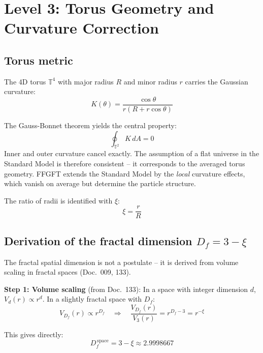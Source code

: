 \section{Level 3: Torus Geometry and Curvature Correction}

\subsection{Torus metric}

The 4D torus $\mathbb{T}^4$ with major radius $R$ and minor radius $r$
carries the Gaussian curvature:
\begin{equation}
    K(\theta) = \frac{\cos\theta}{r(R + r\cos\theta)}
\end{equation}

The Gauss-Bonnet theorem yields the central property:
\begin{equation}
    \oint_{\mathbb{T}^2} K \, dA = 0
\end{equation}
Inner and outer curvature cancel exactly. The assumption of a flat
universe in the Standard Model is therefore consistent -- it corresponds
to the averaged torus geometry. FFGFT extends the Standard Model by
the \emph{local} curvature effects, which vanish on average but
determine the particle structure.

The ratio of radii is identified with $\xi$:
\begin{equation}
    \xi = \frac{r}{R}
\end{equation}

\subsection{Derivation of the fractal dimension \texorpdfstring{$D_f = 3 - \xi$}{Df = 3 - xi}}

The fractal spatial dimension is not a postulate -- it is derived
from volume scaling in fractal spaces (Doc.~009, 133).

\textbf{Step 1: Volume scaling} (from Doc.~133):
In a space with integer dimension $d$, $V_d(r) \propto r^d$.
In a slightly fractal space with $D_f$:
\begin{equation}
    V_{D_f}(r) \propto r^{D_f}
    \quad \Rightarrow \quad
    \frac{V_{D_f}(r)}{V_3(r)} = r^{D_f - 3} = r^{-\xi}
\end{equation}

This gives directly:
\begin{equation}
    \boxed{D_f^{\,\text{space}} = 3 - \xi \approx 2.9998667}
\end{equation}

